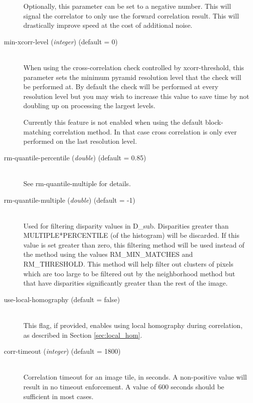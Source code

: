 \begin{description}
  Optionally, this parameter can be set to a negative number. This
  will signal the correlator to only use the forward correlation
  result. This will drastically improve speed at the cost of
  additional noise.

\item[min-xcorr-level \textnormal{\small{(\emph{integer})}} (default = 0)] \hfill \\

  When using the cross-correlation check controlled by xcorr-threshold, this parameter
  sets the minimum pyramid resolution level that the check will be performed at.  By 
  default the check will be performed at every resolution level but you may wish to increase
  this value to save time by not doubling up on processing the largest levels.
  
  Currently this feature is not enabled when using the default block-matching correlation
  method.  In that case cross correlation is only ever performed on the last resolution level.


\item[rm-quantile-percentile \textnormal{\small{(\emph{double})}} (default = 0.85)] \hfill \\
  See rm-quantile-multiple for details.

\item[rm-quantile-multiple \textnormal{\small{(\emph{double})}} (default = -1)] \hfill \\
  Used for filtering disparity values in D\_sub.  Disparities 
  greater than MULTIPLE*PERCENTILE (of the histogram) will be discarded.  
  If this value is set greater
  than zero, this filtering method will be used instead of the
  method using the values RM\_MIN\_MATCHES and RM\_THRESHOLD.
  This method will help filter out clusters of pixels which are too large to be
  filtered out by the neighborhood method but that have disparities significantly
  greater than the rest of the image.

\item[use-local-homography \textnormal (default = false)] \hfill \\

  This flag, if provided, enables using local homography during
  correlation, as described in Section \ref{sec:local_hom}.

\item[corr-timeout \textnormal{\small{(\emph{integer})}} (default = 1800)]\hfill \\

  Correlation timeout for an image tile, in seconds. A non-positive
value will result in no timeout enforcement. A value of 600 seconds
should be sufficient in most cases.


\end{description}
